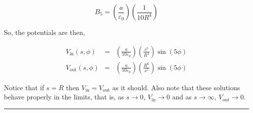 \documentclass[12pt]{article}
\begin{document}
\begin{flushleft}
\[
B_{5} = \left( \frac{a}{\varepsilon_{0}} \right) \left( \frac{1}{10R^{4}} \right)
\]

So, the potentials are then,

\begin{eqnarray*}
V_{\text{in}}(s,\phi) & = &  \left( \frac{a}{10 \varepsilon_{0}} \right) \left( \frac{s^{5}}{R^{4}} \right) \sin{(5\phi)}  \\[4pt]
V_{\text{out}}(s,\phi) &  = &   \left( \frac{a}{10 \varepsilon_{0}} \right) \left( \frac{R^{6}}{s^{5}} \right) \sin{(5\phi)} 
\end{eqnarray*}

Notice that if $s=R$ then $V_{\text{in}}=V_{\text{out}}$ as it should.  Also note that these solutions behave properly in the limits, that is, as $s\rightarrow 0$, $V_{\text{in}} \rightarrow 0$ and as $s\rightarrow \infty$, $V_{\text{out}} \rightarrow 0$.
 
 {\color{grey} \rule{\linewidth}{0.7mm} }\\

\end{flushleft}
\end{document}
